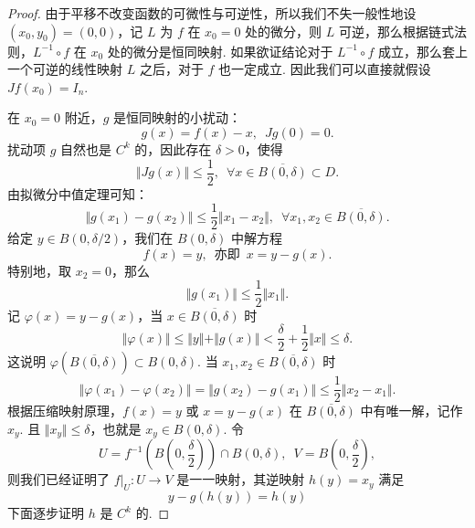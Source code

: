 \begin{proof}

    由于平移不改变函数的可微性与可逆性，所以我们不失一般性地设 $(x_0, y_0) = (0, 0)$，记 $L$ 为 $f$ 在 $x_0 = 0$ 处的微分，则 $L$ 可逆，那么根据链式法则，$L^{-1}\circ f$ 在 $x_0$ 处的微分是恒同映射. 如果欲证结论对于 $L^{-1}\circ f$ 成立，那么套上一个可逆的线性映射 $L$ 之后，对于 $f$ 也一定成立. 因此我们可以直接就假设 $Jf(x_0) = I_n$.

    在 $x_0 = 0$ 附近，$g$ 是恒同映射的小扰动：\[g(x) = f(x) - x,\enspace Jg(0) = 0.\]
    扰动项 $g$ 自然也是 $C^k$ 的，因此存在 $\delta > 0$，使得\[\Vert Jg(x)\Vert \leqslant \frac{1}{2},\enspace \forall x\in \overline{B(0, \delta)}\subset D.\]
    由拟微分中值定理可知：\[\Vert g(x_1) - g(x_2)\Vert \leqslant \frac{1}{2}\Vert x_1 - x_2\Vert,\enspace \forall x_1, x_2\in \overline{B(0, \delta)}.\]
    给定 $y\in B(0, \delta/2)$，我们在 $B(0, \delta)$ 中解方程 \[f(x) = y,\enspace\text{亦即}\enspace x = y - g(x).\]
    特别地，取 $x_2 = 0$，那么 \[\Vert g(x_1) \Vert \leqslant \frac{1}{2}\Vert x_1\Vert.\]
    记 $\varphi(x) = y - g(x)$，当 $x\in \overline{B(0, \delta)}$ 时\[\Vert \varphi(x)\Vert \leqslant \Vert y\Vert +\Vert g(x)\Vert < \frac{\delta}{2} + \frac{1}{2}\Vert x\Vert \leqslant \delta.\]
    这说明 $\varphi(\overline{B(0, \delta)})\subset B(0, \delta)$. 当 $x_1, x_2\in \overline{B(0, \delta)}$ 时\[\Vert \varphi(x_1) - \varphi(x_2) \Vert = \Vert g(x_2) - g(x_1)\Vert \leqslant \frac{1}{2}\Vert x_2 - x_1\Vert.\]
    根据压缩映射原理，$f(x) = y$ 或 $x = y - g(x)$ 在 $\overline{B(0, \delta)}$ 中有唯一解，记作 $x_y$. 且 $\Vert x_y\Vert \leqslant \delta$，也就是 $x_y\in B(0, \delta)$. 令\[U = f^{-1}(B(0, \frac{\delta}{2}))\cap B(0, \delta),\enspace V = B(0, \frac{\delta}{2}),\]
    则我们已经证明了 $\left.f\right|_U \colon U\to V$ 是一一映射，其逆映射 $h(y) = x_y$ 满足 \[y - g(h(y)) = h(y)\]
    下面逐步证明 $h$ 是 $C^k$ 的.


\end{proof}
